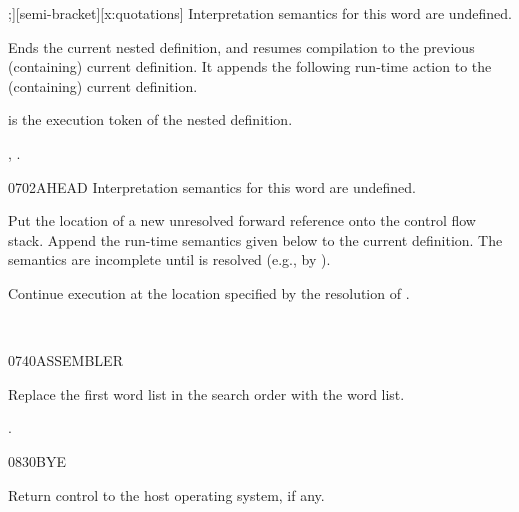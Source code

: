 \pagebreak
\begin{worddef}{}{;]}[semi-bracket][x:quotations]
\interpret
	Interpretation semantics for this word are undefined.

\compile

	Ends the current nested definition, and resumes compilation to the
	previous (containing) current definition. It appends the following
	run-time action to the (containing) current definition.

\runtime
	
	 is the execution token of the nested definition.

\see \wref{tools:[:}{}, \rref{tools:[:}{}.

	\begin{implement}
		\textdf{See \iref{tools:[:}{}.}
	\end{implement}
\end{worddef}


\begin{worddef}{0702}{AHEAD}
\interpret
	Interpretation semantics for this word are undefined.

\compile

	Put the location of a new unresolved forward reference
	 onto the control flow stack. Append the run-time
	semantics given below to the current definition. The semantics
	are incomplete until  is resolved (e.g., by
	).

\runtime
	\stack{}{}

	Continue execution at the location specified by the resolution
	of .

	\begin{testing} %
		 \\
	\end{testing}
\end{worddef}


\begin{worddef}{0740}{ASSEMBLER}
\item \stack{}{}

	Replace the first word list in the search order with the
	 word list.

\see {}.
\end{worddef}


\begin{worddef}{0830}{BYE}
\item \stack{}{}

	Return control to the host operating system, if any.
\end{worddef}

